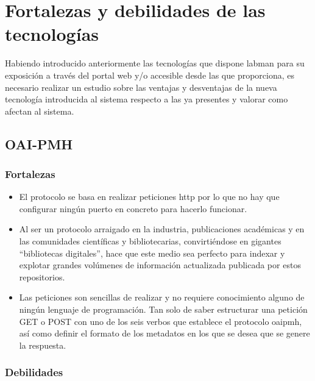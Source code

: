 \section{Fortalezas y debilidades de las tecnologías}

Habiendo introducido anteriormente las tecnologías que dispone \acrshort{labman} para su exposición a través del portal web y/o accesible desde las  que proporciona, es necesario realizar un estudio sobre las ventajas y desventajas de la nueva tecnología introducida al sistema respecto a las ya presentes y valorar como afectan al sistema.

\subsection{OAI-PMH}

\subsubsection{Fortalezas}

\begin{itemize}
	\item El protocolo se basa en realizar peticiones \acrshort{http} por lo que no hay que configurar ningún puerto en concreto para hacerlo funcionar.

	\item Al ser un protocolo arraigado en la industria, publicaciones académicas y en las comunidades científicas y bibliotecarias, convirtiéndose en gigantes ``bibliotecas digitales'', hace que este medio sea perfecto para indexar y explotar grandes volúmenes de información actualizada publicada por estos repositorios.

	\item Las peticiones son sencillas de realizar y no requiere conocimiento alguno de ningún lenguaje de programación. Tan solo de saber estructurar una petición GET o POST con uno de los seis verbos que establece el protocolo \acrshort{oaipmh}, así como definir el formato de los metadatos en los que se desea que se genere la respuesta.
\end{itemize}

\subsubsection{Debilidades}

